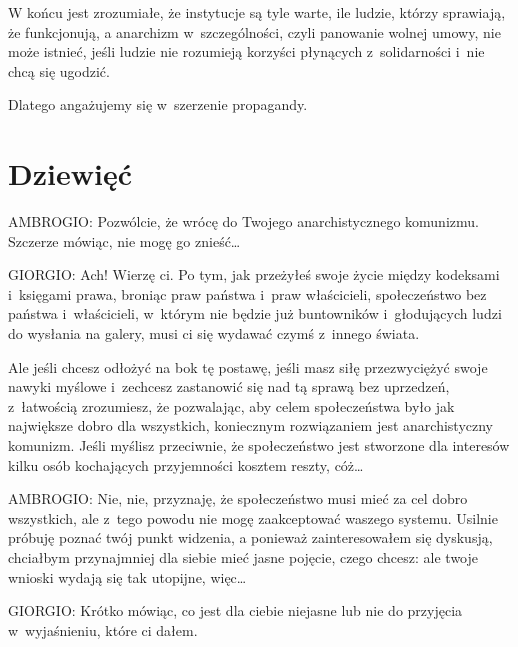 \documentclass[oneside,polish,11pt,sfheadings]{mwbk}
\begin{document}
 
W końcu jest zrozumiałe, że instytucje są tyle warte, ile ludzie, którzy sprawiają, że funkcjonują, a anarchizm w~szczególności, czyli panowanie wolnej umowy, nie może istnieć, jeśli ludzie nie rozumieją korzyści płynących z~solidarności i~nie chcą się ugodzić. 

 
Dlatego angażujemy się w~szerzenie propagandy. 










\chapter*{Dziewięć}



 
\noindent AMBROGIO: Pozwólcie, że wrócę do Twojego anarchistycznego komunizmu. Szczerze mówiąc, nie mogę go znieść\ldots 




 
\noindent GIORGIO: Ach! Wierzę ci. Po tym, jak przeżyłeś swoje życie między kodeksami i~księgami prawa, broniąc praw państwa i~praw właścicieli, społeczeństwo bez państwa i~właścicieli, w~którym nie będzie już buntowników i~głodujących ludzi do
wysłania na galery, musi ci się wydawać czymś z~innego świata. 

 
Ale jeśli chcesz odłożyć na bok tę postawę, jeśli masz siłę przezwyciężyć swoje nawyki myślowe i~zechcesz zastanowić się
nad tą sprawą bez uprzedzeń, z~łatwością zrozumiesz, że pozwalając, aby celem społeczeństwa było jak największe dobro
dla wszystkich, koniecznym rozwiązaniem jest anarchistyczny komunizm. Jeśli myślisz przeciwnie, że społeczeństwo jest
stworzone dla interesów kilku osób kochających przyjemności kosztem reszty, cóż\ldots 




 
\noindent AMBROGIO: Nie, nie, przyznaję, że społeczeństwo musi mieć za cel dobro wszystkich, ale z~tego powodu nie mogę
zaakceptować waszego systemu. Usilnie próbuję poznać twój punkt widzenia, a ponieważ zainteresowałem się dyskusją,
chciałbym przynajmniej dla siebie mieć jasne pojęcie, czego chcesz: ale twoje wnioski wydają się tak utopijne, więc\ldots 




 
\noindent GIORGIO: Krótko mówiąc, co jest dla ciebie niejasne lub nie do przyjęcia w~wyjaśnieniu, które ci dałem. 
\end{document}
